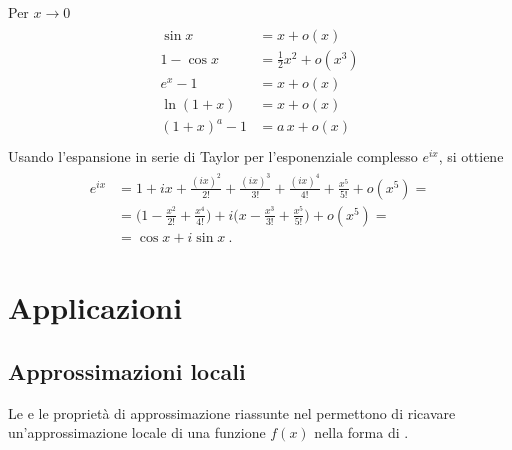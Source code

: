 \documentclass[letterpaper,10pt,italian]{jupyterBook}
\begin{document}
\sphinxAtStartPar
{}
Per \(x \rightarrow 0\)
\begin{equation*}
\begin{split}\begin{aligned}
  \sin x      & = x +o(x) \\
  1 - \cos x  & = \frac{1}{2} x^2 + o(x^3) \\
  e^x - 1     & = x + o(x) \\
  \ln(1+x)    & = x + o(x) \\
  (1+x)^a - 1 & = a \, x + o(x) \\
\end{aligned}\end{split}
\end{equation*}
\sphinxAtStartPar
{} Usando l’espansione in serie di Taylor per l’esponenziale complesso \(e^{ix}\), si ottiene
\begin{equation*}
\begin{split}\begin{aligned}
e^{ix} & = 1 + ix + \frac{(ix)^2}{2!} + \frac{(ix)^3}{3!} + \frac{(ix)^4}{4!} + \frac{x^5}{5!} + o(x^5) = \\
& = \Big( 1 - \frac{x^2}{2!} + \frac{x^4}{4!} \Big) + i \Big( x - \frac{x^3}{3!} + \frac{x^5}{5!} \Big) + o(x^5) = \\
& = \cos x + i \sin x \ .
\end{aligned}\end{split}
\end{equation*}

\section{Applicazioni}
\label{\detokenize{ch/infinitesimal_calculus/derivatives:applicazioni}}\label{\detokenize{ch/infinitesimal_calculus/derivatives:infinitesimal-calculus-derivatives-applications}}

\subsection{Approssimazioni locali}
\label{\detokenize{ch/infinitesimal_calculus/derivatives:approssimazioni-locali}}\label{\detokenize{ch/infinitesimal_calculus/derivatives:infinitesimal-calculus-derivatives-applications-approx}}
\sphinxAtStartPar
Le {\hyperref[\detokenize{ch/infinitesimal_calculus/derivatives:infinitesimal-calculus-derivatives-taylor}]{}} e le proprietà di approssimazione riassunte nel {\hyperref[\detokenize{ch/infinitesimal_calculus/derivatives:thm:infinitesimal-calculus:derivatives:taylor}]{}} permettono di ricavare un’approssimazione locale di una funzione \(f(x)\) nella forma di .
\end{document}
